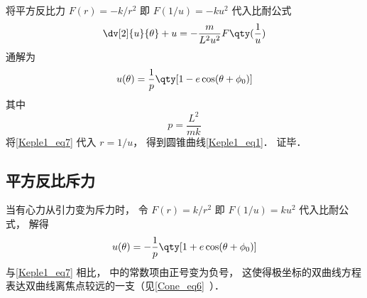 将平方反比力 $F(r) = -k/r^2$ 即 $F(1/u) = -ku^2$ 代入比耐公式
\begin{equation}
\dv[2]{u}{\theta} + u = -\frac{m}{L^2 u^2} F\qty(\frac 1u)
\end{equation}
通解为
\begin{equation}\label{Keple1_eq7}
u(\theta) = \frac{1}{p} \qty[1 - e\cos(\theta  + \phi_0)]
\end{equation}
其中
\begin{equation}
p = \frac{L^2}{mk}
\end{equation}
将\autoref{Keple1_eq7} 代入 $r = 1/u$， 得到圆锥曲线\autoref{Keple1_eq1}． 证毕．

\subsection{平方反比斥力}
当有心力从引力变为斥力时， 令 $F(r) = k/r^2$ 即 $F(1/u) = ku^2$ 代入比耐公式， 解得
\begin{equation}%
u(\theta) = -\frac{1}{p} \qty[1 + e\cos(\theta  + \phi_0)]
\end{equation}
与\autoref{Keple1_eq7} 相比， 中的常数项由正号变为负号， 这使得极坐标的双曲线方程表达双曲线离焦点较远的一支（见\autoref{Cone_eq6}~）．
